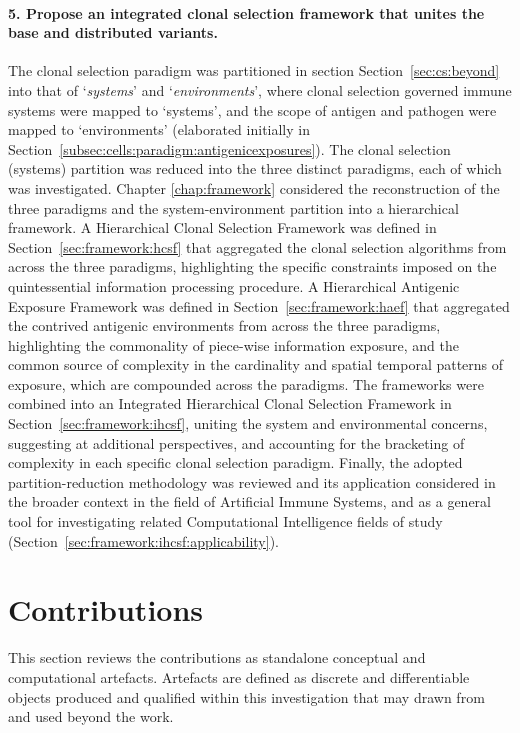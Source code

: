 \paragraph{5. Propose an integrated clonal selection framework that unites the base and distributed variants.}
The clonal selection paradigm was partitioned in section Section~\ref{sec:cs:beyond} into that of `\emph{systems}' and `\emph{environments}', where clonal selection governed immune systems were mapped to `systems', and the scope of antigen and pathogen were mapped to `environments' (elaborated initially in Section~\ref{subsec:cells:paradigm:antigenicexposures}). The clonal selection (systems) partition was reduced into the three distinct paradigms, each of which was investigated. 
Chapter \ref{chap:framework} considered the reconstruction of the three paradigms and the system-environment partition into a hierarchical framework.
A Hierarchical Clonal Selection Framework was defined in Section~\ref{sec:framework:hcsf} that aggregated the clonal selection algorithms from across the three paradigms, highlighting the specific constraints imposed on the quintessential information processing procedure. 
A Hierarchical Antigenic Exposure Framework was defined in Section~\ref{sec:framework:haef} that aggregated the contrived antigenic environments from across the three paradigms, highlighting the commonality of piece-wise information exposure, and the common source of complexity in the cardinality and spatial temporal patterns of exposure, which are compounded across the paradigms.
The frameworks were combined into an Integrated Hierarchical Clonal Selection Framework in Section~\ref{sec:framework:ihcsf}, uniting the system and environmental concerns, suggesting at additional perspectives, and accounting for the bracketing of complexity in each specific clonal selection paradigm.
Finally, the adopted partition-reduction methodology was reviewed and its application considered in the broader context in the field of Artificial Immune Systems, and as a general tool for investigating related Computational Intelligence fields of study (Section~\ref{sec:framework:ihcsf:applicability}).

%
%
\section{Contributions}
\label{sec:conclusion:contributions}
This section reviews the contributions as standalone conceptual and computational artefacts. Artefacts are defined as discrete and differentiable objects produced and qualified within this investigation that may drawn from and used beyond the work.

